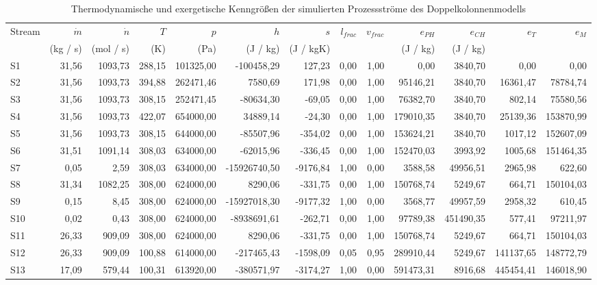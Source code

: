 \begin{longtable}{lrrrrrrrrrrrr}
\caption{Thermodynamische und exergetische Kenngrößen der simulierten Prozessströme des Doppelkolonnenmodells} \\
\hline
Stream & $\dot m$ & $\dot n$ & $T$ & $p$ & $h$ & $s$ & $l_{frac}$ & $v_{frac}$ & $e_{PH}$ & $e_{CH}$ & $e_T$ & $e_M$ \\
 & (kg / s) & (mol / s) & (K) & (Pa) & (J / kg) & (J / kgK) &  &  & (J / kg) & (J / kg) &  &  \\
\hline
S1 & 31,56 & 1093,73 & 288,15 & 101325,00 & -100458,29 & 127,23 & 0,00 & 1,00 & 0,00 & 3840,70 & 0,00 & 0,00 \\
S2 & 31,56 & 1093,73 & 394,88 & 262471,46 & 7580,69 & 171,98 & 0,00 & 1,00 & 95146,21 & 3840,70 & 16361,47 & 78784,74 \\
S3 & 31,56 & 1093,73 & 308,15 & 252471,45 & -80634,30 & -69,05 & 0,00 & 1,00 & 76382,70 & 3840,70 & 802,14 & 75580,56 \\
S4 & 31,56 & 1093,73 & 422,07 & 654000,00 & 34889,14 & -24,30 & 0,00 & 1,00 & 179010,35 & 3840,70 & 25139,36 & 153870,99 \\
S5 & 31,56 & 1093,73 & 308,15 & 644000,00 & -85507,96 & -354,02 & 0,00 & 1,00 & 153624,21 & 3840,70 & 1017,12 & 152607,09 \\
S6 & 31,51 & 1091,14 & 308,03 & 634000,00 & -62015,96 & -336,45 & 0,00 & 1,00 & 152470,03 & 3993,92 & 1005,68 & 151464,35 \\
S7 & 0,05 & 2,59 & 308,03 & 634000,00 & -15926740,50 & -9176,84 & 1,00 & 0,00 & 3588,58 & 49956,51 & 2965,98 & 622,60 \\
S8 & 31,34 & 1082,25 & 308,00 & 624000,00 & 8290,06 & -331,75 & 0,00 & 1,00 & 150768,74 & 5249,67 & 664,71 & 150104,03 \\
S9 & 0,15 & 8,45 & 308,00 & 624000,00 & -15927018,30 & -9177,32 & 1,00 & 0,00 & 3568,77 & 49957,59 & 2958,32 & 610,45 \\
S10 & 0,02 & 0,43 & 308,00 & 624000,00 & -8938691,61 & -262,71 & 0,00 & 1,00 & 97789,38 & 451490,35 & 577,41 & 97211,97 \\
S11 & 26,33 & 909,09 & 308,00 & 624000,00 & 8290,06 & -331,75 & 0,00 & 1,00 & 150768,74 & 5249,67 & 664,71 & 150104,03 \\
S12 & 26,33 & 909,09 & 100,88 & 614000,00 & -217465,43 & -1598,09 & 0,05 & 0,95 & 289910,44 & 5249,67 & 141137,65 & 148772,79 \\
S13 & 17,09 & 579,44 & 100,31 & 613920,00 & -380571,97 & -3174,27 & 1,00 & 0,00 & 591473,31 & 8916,68 & 445454,41 & 146018,90 \\

\end{longtable}
